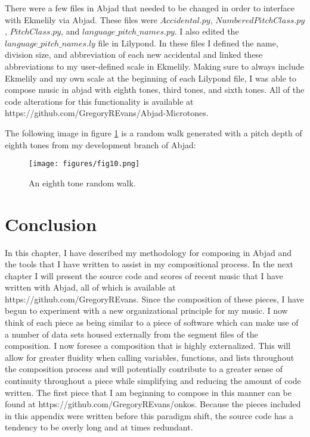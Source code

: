 There were a few files in Abjad that needed to be changed in order to interface with Ekmelily via Abjad. These files were $Accidental.py$, $NumberedPitchClass.py$, $PitchClass.py$, and $language\_pitch\_names.py$. I also edited the $language\_pitch\_names.ly$ file in Lilypond. In these files I defined the name, division size, and abbreviation of each new accidental and linked these abbreviations to my user-defined scale in Ekmelily. Making sure to always include Ekmelily and my own scale at the beginning of each Lilypond file, I was able to compose music in abjad with eighth tones, third tones, and sixth tones. All of the code alterations for this functionality is available at https://github.com/GregoryREvans/Abjad-Microtones.

The following image in figure \ref{fig:eighth_random_walk} is a random walk generated with a pitch depth of eighth tones from my development branch of Abjad:

\singlespace
\begin{figure}[h]
  \texttt{[image: figures/fig10.png]}
  \caption{An eighth tone random walk.}
  \label{fig:eighth_random_walk}
\end{figure}
\doublespace

\section{Conclusion}

In this chapter, I have described my methodology for composing in Abjad and the tools that I have written to assist in my compositional process. In the next chapter I will present the source code and scores of recent music that I have written with Abjad, all of which is available at https://github.com/GregoryREvans. Since the composition of these pieces, I have begun to experiment with a new organizational principle for my music. I now think of each piece as being similar to a piece of software which can make use of a number of data sets housed externally from the segment files of the composition. I now foresee a composition that is highly externalized. This will allow for greater fluidity when calling variables, functions, and lists throughout the composition process and will potentially contribute to a greater sense of continuity throughout a piece while simplifying and reducing the amount of code written. The first piece that I am beginning to compose in this manner can be found at https://github.com/GregoryREvans/onkos. Because the pieces included in this appendix were written before this paradigm shift, the source code has a tendency to be overly long and at times redundant.

\singlespace